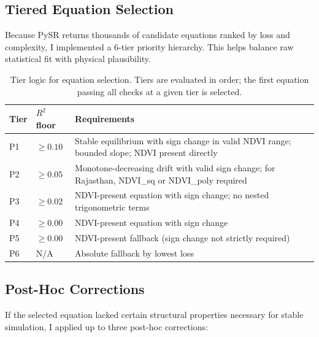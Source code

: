 \documentclass[12pt, a4paper]{article}
\begin{document}
\subsection{Tiered Equation Selection}

Because PySR returns thousands of candidate equations ranked by loss and complexity, I implemented a 6-tier priority hierarchy. This helps balance raw statistical fit with physical plausibility.

\begin{table}[H]
\centering
\caption{Tier logic for equation selection. Tiers are evaluated in order; the first equation passing all checks at a given tier is selected.}
\label{tab:tiers}
\begin{tabularx}{\textwidth}{p{1.2cm} p{1.8cm} X}
\toprule
\textbf{Tier} & \textbf{$R^2$ floor} & \textbf{Requirements} \\
\midrule
P1 & $\geq 0.10$ & Stable equilibrium with sign change in valid NDVI range; bounded slope; NDVI present directly \\
P2 & $\geq 0.05$ & Monotone-decreasing drift with valid sign change; for Rajasthan, NDVI\_sq or NDVI\_poly required \\
P3 & $\geq 0.02$ & NDVI-present equation with sign change; no nested trigonometric terms \\
P4 & $\geq 0.00$ & NDVI-present equation with sign change \\
P5 & $\geq 0.00$ & NDVI-present fallback (sign change not strictly required) \\
P6 & N/A & Absolute fallback by lowest loss \\
\bottomrule
\end{tabularx}
\vspace{2pt}
\end{table}

\subsection{Post-Hoc Corrections}

If the selected equation lacked certain structural properties necessary for stable simulation, I applied up to three post-hoc corrections:

\end{document}
